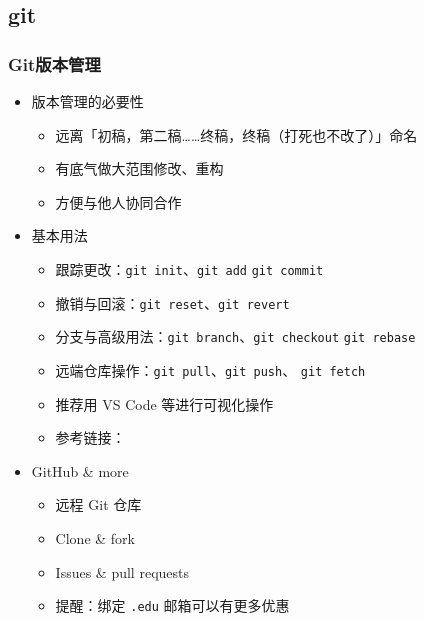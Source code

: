 \subsection{git}

\begin{frame}[fragile]
  \frametitle{Git版本管理}
  \begin{itemize}
    \item<+-> 版本管理的必要性
      \begin{itemize}
        \item 远离「初稿，第二稿……终稿，终稿（打死也不改了）」命名
        \item 有底气做大范围修改、重构
        \item 方便与他人协同合作
      \end{itemize}
    \item<+-> 基本用法
      \begin{itemize}
        \item 跟踪更改：\verb|git init|、\verb|git add|
              \verb|git commit|
        \item 撤销与回滚：\verb|git reset|、\verb|git revert|
        \item 分支与高级用法：\verb|git branch|、\verb|git checkout|
              \verb|git rebase|
        \item 远端仓库操作：\verb|git pull|、\verb|git push|、
              \verb|git fetch|
        \item 推荐用 VS Code 等进行可视化操作
        \item 参考链接：
      \end{itemize}

    \item<+-> GitHub \href{https://github.com}{\faGithub} \& more

      \begin{itemize}
        \item 远程 Git 仓库
        \item Clone \& fork
        \item Issues \& pull requests
        \item<+-> \alert{提醒：绑定 \texttt{.edu} 邮箱可以有更多优惠}
      \end{itemize}
  \end{itemize}
\end{frame}
